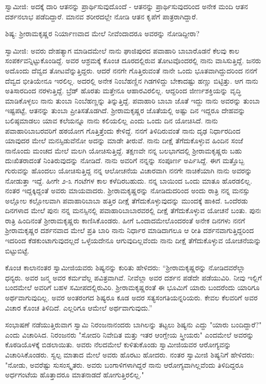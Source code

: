 ಸ್ವಾಮೀಜಿ: ಅದಕ್ಕೆ ದಾರಿ ಆತನನ್ನು ಪ್ರಾರ್ಥಿಸುವುದೊಂದೆ - ಆತನನ್ನು ಪ್ರಾರ್ಥಿಸುವುದರಿಂದ ಅನೇಕ ಮಂದಿ ಆತನ ದರ್ಶನಲಾಭ ಪಡೆದಿದ್ದಾರೆ. ಮಾನವ ಶರೀರದಲ್ಲೇ ನೋಡಿ ಆತನ ಕೃಪೆಗೆ ಪಾತ್ರರಾಗಿದ್ದಾರೆ.

ಶಿಷ್ಯ: ಶ‍್ರೀರಾಮಕೃಷ್ಣರ ನಿರ್ಯಾಣವಾದ ಮೇಲೆ ನೀವೆಂದಾದರೂ ಅವರನ್ನು ನೋಡಿದ್ದೀರಾ?

ಸ್ವಾಮೀಜಿ: ಅವರು ದೇಹತ್ಯಾಗ ಮಾಡಿದಮೇಲೆ ನಾನು ಘಾಜಿಪುರದ ಪವಾಹಾರಿ ಬಾಬಾರೊಡನೆ ಕೆಲವು ಕಾಲ ಸಂಪರ್ಕವನ್ನಿಟ್ಟುಕೊಂಡಿದ್ದೆ. ಅವರ ಆಶ್ರಮಕ್ಕೆ ಕೊಂಚ ದೂರದಲ್ಲಿರುವ ತೋಟವೊಂದರಲ್ಲಿ ನಾನು ವಾಸಿಸುತ್ತಿದ್ದೆ. ಜನರು ಅದೊಂದು ದೆವ್ವದ ತೋಟವೆನ್ನುತ್ತಿದ್ದರು. ಆದರೆ ನನಗೇ ಗೊತ್ತಿರುವಂತೆ ನಾನೇ ಒಂದು ಭೂತವಾಗಿದ್ದುದರಿಂದ ನನಗೆ ದೆವ್ವದ ಭೀತಿಯೇನೂ ಇರಲಿಲ್ಲ. ಅದರಲ್ಲಿ ಅನೇಕ ನಿಂಬೆಹಣ್ಣಿನ ಗಿಡಗಳಿದ್ದು ಬೇಕಾದಷ್ಟು ಹಣ್ಣು ಬಿಟ್ಟಿತ್ತು. ಆಗ ನಾನು ಅತಿಸಾರದಿಂದ ನರಳುತ್ತಿದ್ದೆ. ಬ್ರೆಡ್ ಹೊರತು ಮತ್ತೇನೂ ಆಹಾರವಿರಲಿಲ್ಲ. ಆದ್ದರಿಂದ ಜೀರ್ಣಶಕ್ತಿಯನ್ನು ವೃದ್ಧಿ ಮಾಡಿಕೊಳ್ಳಲು ನಾನು ತುಂಬಾ ನಿಂಬೆಹಣ್ಣನ್ನು ತಿನ್ನುತ್ತಿದ್ದೆ. ಪವಾಹಾರಿ ಬಾಬಾ ಜೊತೆ ಇದ್ದು ನಾನು ಅವರನ್ನು ತುಂಬಾ ಇಷ್ಟಪಟ್ಟೆ, ಆತನನ್ನು ತುಂಬಾ ಪ್ರೀತಿಸತೊಡಗಿದೆ. ಶ‍್ರೀರಾಮಕೃಷ್ಣರ ಜೊತೆಯಲ್ಲಿ ಅಷ್ಟು ದಿನ ಇದ್ದರೂ ದೇಹವನ್ನು ಬಲಿಷ್ಠಮಾಡಲು ಯಾವ ಕಲೆಯನ್ನೂ ನಾನು ಕಲಿಯಲಿಲ್ಲ ಎಂದು ಒಂದು ದಿನ ಯೋಚಿಸಿದೆ. ನಾನು ಪವಾಹಾರಿಬಾಬರವರಿಗೆ ಹಠಯೋಗ ಗೊತ್ತಿತ್ತೆಂದು ಕೇಳಿದ್ದೆ. ನನಗೆ ತಿಳಿದಿರುವಂತೆ ನಾನು ದೃಢ ನಿರ್ಧಾರದಿಂದ ಯಾವುದರ ಮೇಲೆ ಮನಸ್ಸಿಡುವೆನೋ ಅದನ್ನು ಮಾಡೇ ತೀರುವೆ. ನಾನು ದೀಕ್ಷೆ ತೆಗೆದುಕೊಳ್ಳುವ ಹಿಂದಿನ ಸಂಜೆ ನಾನೊಂದು ಮಂಚದ ಮೇಲೆ ಮಲಗಿ ಯೋಚಿಸುತ್ತಿದ್ದೆ. ತಕ್ಷಣವೇ ನನ್ನ ಬಲಭಾಗದಲ್ಲಿ ಶ‍್ರೀರಾಮಕೃಷ್ಣರು ಬಹು ದುಃಖಿತರಾದಂತೆ ನಿಂತಿರುವುದನ್ನು ನೋಡಿದೆ. ನಾನು ಅವರಿಗೆ ನನ್ನನ್ನು ಸಂಪೂರ್ಣ ಅರ್ಪಿಸಿದ್ದೆ. ಈಗ ಮತ್ತೊಬ್ಬ ಗುರುವನ್ನು ಹೊಂದಲು ಯೋಚಿಸುತ್ತಿದ್ದ ನನ್ನ ಆಲೋಚನೆಯ ವಿಚಾರವಾಗಿ ನನಗೇ ನಾಚಿಕೆಯಾಗಿ ನಾನು ಅವರನ್ನು ನೋಡುತ್ತಾ ಇದ್ದೆ. ಹೀಗೇ ೨-೩ ಗಂಟೆಗಳ ಕಾಲ ಕಳೆದಿರಬಹುದು. ನನ್ನ ಬಾಯಿಂದ ಒಂದು ಮಾತೂ ಹೊರಡಲಿಲ್ಲ. ನಂತರ ಇದ್ದಕ್ಕಿದ್ದಂತೆ ಅವರು ಮಾಯವಾದರು. ಶ‍್ರೀರಾಮಕೃಷ್ಣರನ್ನು ನೋಡಿದುದರಿಂದ ಅಂದು ರಾತ್ರಿ ನನ್ನ ಮನಸ್ಸು ಅಲ್ಲೋಲ ಕಲ್ಲೋಲವಾಗಿ ಪವಾಹಾರಿಬಾಬಾ ಹತ್ತಿರ ದೀಕ್ಷೆ ತೆಗೆದುಕೊಳ್ಳುವುದನ್ನು ಮುಂದಕ್ಕೆ ಹಾಕಿದೆ. ಒಂದೆರಡು ದಿನಗಳಾದ ಮೇಲೆ ಪುನಃ ನನ್ನ ಮನಸ್ಸಿನಲ್ಲಿ ಪವಾಹಾರಿಬಾಬಾರವರಲ್ಲಿ ದೀಕ್ಷೆ ತೆಗೆದುಕೊಳ್ಳುವ ಯೋಚನೆ ಬಂತು. ಪುನಃ ರಾತ್ರಿ ಹಿಂದಿನಂತೆ ಶ‍್ರೀರಾಮಕೃಷ್ಣರು ಕಾಣಿಸಿಕೊಂಡರು. ಹೀಗೆ ಒಂದಾದಮೇಲೊಂದರಂತೆ ಅನೇಕ ದಿನಗಳು ನನಗೆ ಶ‍್ರೀರಾಮಕೃಷ್ಣರ ದರ್ಶನವಾದ ಮೇಲೆ ಪ್ರತಿ ಬಾರಿ ನಾನು ನಿರ್ಧಾರ ಮಾಡಿದಾಗಲೂ ಆ ರೀತಿ ದರ್ಶನವಾಗುತ್ತಿದ್ದರಿಂದ ಇದರಿಂದ ಕೆಡಕುಂಟಾಗುವುದಲ್ಲದೆ ಒಳ್ಳೆಯದೇನೂ ಆಗುವುದಿಲ್ಲವೆಂದು ನಾನು ದೀಕ್ಷೆ ತೆಗೆದುಕೊಳ್ಳುವ ಯೋಚನೆಯನ್ನು ಬಿಟ್ಟುಬಿಟ್ಟೆ.

ಕೊಂಚ ಕಾಲಾನಂತರ ಸ್ವಾಮೀಜಿಯವರು ಶಿಷ್ಯನನ್ನು ಕುರಿತು ಹೇಳಿದರು: “ಶ‍್ರೀರಾಮಕೃಷ್ಣರನ್ನು ನೋಡಿದವರೆಲ್ಲಾ ಧನ್ಯರು. ಅವರ ಜನ್ಮ ಅವರ ಕರ್ಮವೆಲ್ಲ ಪವಿತ್ರವಾಗಿವೆ. ನೀವೆಲ್ಲಾ ಅವರ ದರ್ಶನ ಪಡೆದೇ ಪಡೆಯುವಿರಿ. ನೀವು ಇಲ್ಲಿಗೆ ಬಂದಮೇಲೆ ಅವರಿಗೆ ಬಹಳ ಸಮೀಪದಲ್ಲಿರುವಿರಿ. ಶ‍್ರೀರಾಮಕೃಷ್ಣರಂತೆ ಈ ಭೂಮಿಗೆ ಯಾರು ಬಂದರೆಂದು ಯಾರಿಗೂ ಅರ್ಥವಾಗುವುದಿಲ್ಲ. ಅವರ ಅಂತರಂಗದ ಶಿಷ್ಯರೂ ಕೂಡ ಅದರ ಸತ್ಯಸಂಗತಿಯನ್ನರಿಯರು. ಕೇವಲ ಕೆಲವರಿಗೆ ಅವರ ವಿಚಾರ ಕೊಂಚ ತಿಳಿದಿದೆ. ಎಲ್ಲರಿಗೂ ಆಮೇಲೆ ಅರ್ಥವಾಗುವುದು.”

ಸಂಭಾಷಣೆ ನಡೆಯುತ್ತಿರುವಾಗ ಸ್ವಾಮಿ ನಿರಂಜನಾನಂದರು ಬಾಗಿಲನ್ನು ತಟ್ಟಲು ಶಿಷ್ಯನು ಎದ್ದು "ಯಾರು ಬಂದಿದ್ದಾರೆ?" ಎಂದು ವಿಚಾರಿಸಿದ. ನಿರಂಜನರು "ಸೋದರಿ ನಿವೇದಿತ ಮತ್ತು ಇತರ ಆಂಗ್ಲೇಯ ಸ್ತ್ರೀಯರು" ಎಂದಮೇಲೆ ಅವರನ್ನು ಕೊಠಡಿಯೊಳಕ್ಕೆ ಬಿಡಲಾಯಿತು. ಅವರು ನೆಲದಮೇಲೆ ಕುಳಿತುಕೊಂಡು ಸ್ವಾಮೀಜಿಯವರ ಆರೋಗ್ಯವನ್ನು ವಿಚಾರಿಸಿಕೊಂಡರು. ಸ್ವಲ್ಪ ಮಾತಾದ ಮೇಲೆ ಅವರು ಹೊರಟು ಹೋದರು. ನಂತರ ಸ್ವಾಮೀಜಿ ಶಿಷ್ಯನಿಗೆ ಹೇಳಿದರು: "ನೋಡು, ಅವರೆಷ್ಟು ಸುಸಂಸ್ಕೃತರು. ಅವರು ಬಂಗಾಳಿಗಳಾಗಿದ್ದರೆ ನಾನು ಆರೋಗ್ಯವಾಗಿಲ್ಲವೆಂದು ತಿಳಿದಿದ್ದರೂ ಅರ್ಧಗಂಟೆಯ ಹೊತ್ತಾದರೂ ಮಾತನಾಡದೆ ಹೋಗುತ್ತಿರಲಿಲ್ಲ."

